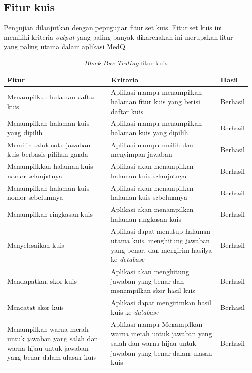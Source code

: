 \subsection{Fitur kuis}
Pengujian dilanjutkan dengan pepngujian fitur set kuis. Fitur set kuis ini memiliki kriteria \textit{output} yang paling banyak dikarenakan ini merupakan fitur yang paling utama dalam aplikasi MedQ.
\begin{table}[H]
	\caption{\textit{Black Box Testing} fitur kuis}
	\label{Tab:blackBoxKuis}
	\begin{tabular}{|p{}|p{}|p{}|}
		\hline
		 \centering\textbf{Fitur} & \multicolumn{1}{m{0.45\textwidth}|}{\centering \textbf{Kriteria}}&  \multicolumn{1}{m{0.1\textwidth}|}{\centering \textbf{Hasil}}\\
		\hline
		Menampilkan halaman daftar kuis
		&  Aplikasi mampu menampilkan halaman fitur kuis yang berisi daftar kuis
		& Berhasil\\
		\hline
		Menampilkan halaman kuis yang dipilih
		& Aplikasi mampu menampilkan halaman kuis yang dipilih 
		& Berhasil\\
		\hline
		Memilih salah satu jawaban kuis berbasis pilihan ganda
		& Aplikasi mampu meilih dan menyimpan jawaban 
		& Berhasil\\
		\hline
		Menampilkkan halaman kuis nomor selanjutnya
		& Aplikasi akan menampilkan halaman kuis selanjutnya
		& Berhasil\\
		\hline
		Menampilkan halaman kuis nomor sebelumnya
		& Aplikasi akan menampilkan halaman kuis sebelumnya 
		& Berhasil\\
		\hline
		Menampilkan ringkasan kuis
		& Aplikasi akan menampilkan halaman ringkasan kuis 
		& Berhasil\\
		\hline
		Menyelesaikan kuis
		& Aplikasi dapat menutup halaman utama kuis, menghitung jawaban yang benar, dan mengirim hasilya ke \textit{database}
		& Berhasil\\
		\hline
		Mendapatkan skor kuis
		& Aplikasi akan  menghitung jawaban yang benar dan menampilkan skor hasil kuis
		& Berhasil\\
		\hline
		Mencatat skor kuis
		& Aplikasi dapat mengirimkan hasil kuis ke \textit{database}
		& Berhasil\\
		\hline
		Menampilkan warna merah untuk jawaban yang salah dan warna hijau untuk jawaban yang benar dalam ulasan kuis
		& Aplikasi mampu Menampilkan warna merah untuk jawaban yang salah dan warna hijau untuk jawaban yang benar dalam ulasan kuis 
		& Berhasil\\
		\hline
	\end{tabular}
\end{table}
